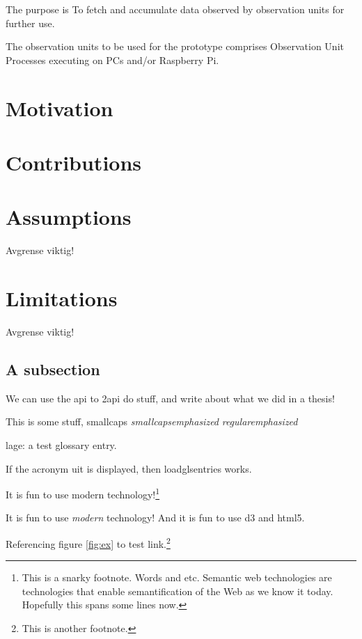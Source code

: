 \documentclass[USenglish]{uit-thesis}
\begin{document}
The purpose is
To fetch and accumulate data observed by observation units for further use.

The observation units to be used for the prototype comprises
Observation Unit Processes executing on PCs and/or Raspberry Pi.


\section{Motivation}

\section{Contributions}

\section{Assumptions}
Avgrense viktig!

\section{Limitations}
Avgrense viktig!

\iffalse
\subsection{A subsection}

We can use the \ac{api} to \ac{2api} do stuff, and write about what we did in a \gls{thesis}!

This is some stuff, {\sc smallcaps {\em smallcapsemphasized}} {\em regularemphasized}

\Gls{lage}: a test glossary entry.

If the acronym \ac{uit} is displayed, then loadglsentries works.

It is fun to use modern  technology!\footnote{This is a snarky
footnote. Words and etc. Semantic web technologies are technologies that enable
semantification of the Web as we know it today. Hopefully this spans some lines
now.}

It is fun to use \emph{modern } technology! And it is fun to use \ac{d3} and \ac{html5}.

Referencing figure \ref{fig:ex} to test link.\footnote{This is another
footnote.}
\end{document}
